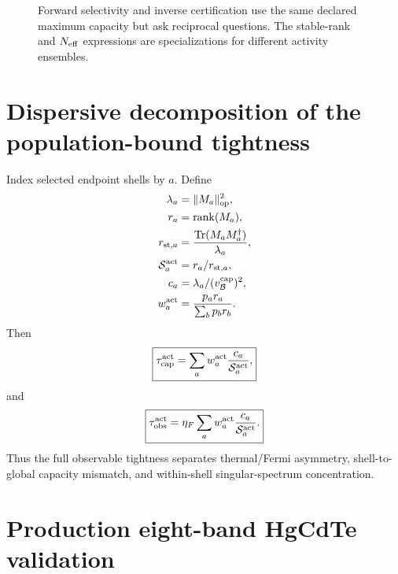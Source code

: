 \documentclass[aps,twocolumn,superscriptaddress,longbibliography]{revtex4-2}
\newcommand{\Tr}{\operatorname{Tr}}
\newcommand{\rank}{\operatorname{rank}}
\newcommand{\op}{\operatorname{op}}
\newcommand{\cB}{\mathcal B}
\newcommand{\cS}{\mathcal S}
\begin{document}
\begin{figure}[t]
\centering
{}
\caption{Forward selectivity and inverse certification use the same declared maximum capacity but ask reciprocal questions. The stable-rank and $N_{\rm eff}$ expressions are specializations for different activity ensembles.}
\label{fig:geometry}
\end{figure}

\section{Dispersive decomposition of the population-bound tightness}

Index selected endpoint shells by $a$. Define
\begin{align}
\lambda_a&=\|M_a\|_{\op}^2,\\
r_a&=\rank(M_a),\\
r_{{\rm st},a}&=\frac{\Tr(M_aM_a^\dagger)}{\lambda_a},\\
\cS_a^{\rm act}&=r_a/r_{{\rm st},a},\\
c_a&=\lambda_a/(v_{\cB}^{\rm cap})^2,\\
w_a^{\rm act}&=\frac{p_ar_a}{\sum_bp_br_b}.
\end{align}
Then
\begin{equation}
\boxed{
\tau_{\rm cap}^{\rm act}=\sum_aw_a^{\rm act}\frac{c_a}{\cS_a^{\rm act}},}
\label{eq:shell-decomp}
\end{equation}
and
\begin{equation}
\boxed{
\tau_{\rm obs}^{\rm act}=\eta_F\sum_aw_a^{\rm act}\frac{c_a}{\cS_a^{\rm act}}.}
\label{eq:shell-observable}
\end{equation}
Thus the full observable tightness separates thermal/Fermi asymmetry, shell-to-global capacity mismatch, and within-shell singular-spectrum concentration.

\section{Production eight-band HgCdTe validation}
\end{document}
